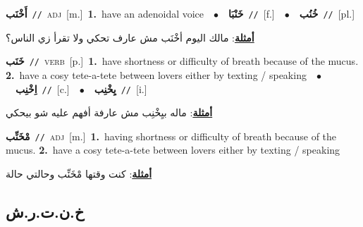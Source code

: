 \documentclass[10pt,a4paper,twoside]{article} %
\begin{document}
\begin{multicols}{2}
{\setlength\topsep{0pt}\textbf{\foreignlanguage{arabic}{أَخْنَب}}\ {\color{gray}\texttt{//}\color{black}}\ \textsc{adj}\ [m.]\ \textbf{1.}~have an adenoidal voice\ \ $\bullet$\ \ \setlength\topsep{0pt}\textbf{\foreignlanguage{arabic}{خَنْبَا}}\ {\color{gray}\texttt{//}\color{black}}\ [f.]\ \ $\bullet$\ \ \setlength\topsep{0pt}\textbf{\foreignlanguage{arabic}{خُنُب}}\ {\color{gray}\texttt{//}\color{black}}\ [pl.]\  \begin{flushright}\color{gray}\foreignlanguage{arabic}{\textbf{\underline{\foreignlanguage{arabic}{أمثلة}}}: مالك اليوم أخْنَب مش عارف تحكي ولا تقرأ زي الناس؟}\end{flushright}\color{black}} \vspace{2mm}

{\setlength\topsep{0pt}\textbf{\foreignlanguage{arabic}{خَنَب}}\ {\color{gray}\texttt{//}\color{black}}\ \textsc{verb}\ [p.]\ \textbf{1.}~have shortness or difficulty of breath because of the mucus.  \textbf{2.}~have a cosy tete-a-tete between lovers either by texting / speaking\ \ $\bullet$\ \ \setlength\topsep{0pt}\textbf{\foreignlanguage{arabic}{اِخْنِب}}\ {\color{gray}\texttt{//}\color{black}}\ [c.]\ \ $\bullet$\ \ \setlength\topsep{0pt}\textbf{\foreignlanguage{arabic}{يِخْنِب}}\ {\color{gray}\texttt{//}\color{black}}\ [i.]\  \begin{flushright}\color{gray}\foreignlanguage{arabic}{\textbf{\underline{\foreignlanguage{arabic}{أمثلة}}}: ماله بيِخْنِب مش عارفة أفهم عليه شو بيحكي}\end{flushright}\color{black}} \vspace{2mm}

{\setlength\topsep{0pt}\textbf{\foreignlanguage{arabic}{مْخَنِّب}}\ {\color{gray}\texttt{//}\color{black}}\ \textsc{adj}\ [m.]\ \textbf{1.}~having shortness or difficulty of breath because of the mucus.  \textbf{2.}~have a cosy tete-a-tete between lovers either by texting / speaking\  \begin{flushright}\color{gray}\foreignlanguage{arabic}{\textbf{\underline{\foreignlanguage{arabic}{أمثلة}}}: كنت وقتها مْخَنِّب وحالتي حالة}\end{flushright}\color{black}} \vspace{2mm}

\vspace{-3mm}
\subsection*{\color{blue}\foreignlanguage{arabic}{خ.ن.ت.ر.ش}\color{blue}{ (ntws)}} 


\end{multicols}
\end{document}
